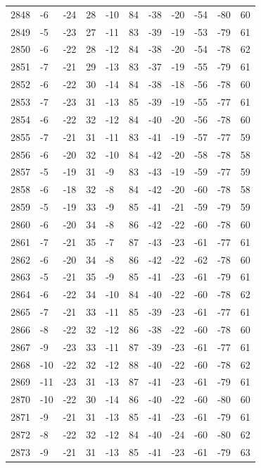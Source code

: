 \begin{table}[H]
\begin{tabular}{lllllllllll}
2848 & -6 & -24 & 28 & -10 & 84 & -38 & -20 & -54 & -80 & 60 \\
2849 & -5 & -23 & 27 & -11 & 83 & -39 & -19 & -53 & -79 & 61 \\
2850 & -6 & -22 & 28 & -12 & 84 & -38 & -20 & -54 & -78 & 62 \\
2851 & -7 & -21 & 29 & -13 & 83 & -37 & -19 & -55 & -79 & 61 \\
2852 & -6 & -22 & 30 & -14 & 84 & -38 & -18 & -56 & -78 & 60 \\
2853 & -7 & -23 & 31 & -13 & 85 & -39 & -19 & -55 & -77 & 61 \\
2854 & -6 & -22 & 32 & -12 & 84 & -40 & -20 & -56 & -78 & 60 \\
2855 & -7 & -21 & 31 & -11 & 83 & -41 & -19 & -57 & -77 & 59 \\
2856 & -6 & -20 & 32 & -10 & 84 & -42 & -20 & -58 & -78 & 58 \\
2857 & -5 & -19 & 31 & -9 & 83 & -43 & -19 & -59 & -77 & 59 \\
2858 & -6 & -18 & 32 & -8 & 84 & -42 & -20 & -60 & -78 & 58 \\
2859 & -5 & -19 & 33 & -9 & 85 & -41 & -21 & -59 & -79 & 59 \\
2860 & -6 & -20 & 34 & -8 & 86 & -42 & -22 & -60 & -78 & 60 \\
2861 & -7 & -21 & 35 & -7 & 87 & -43 & -23 & -61 & -77 & 61 \\
2862 & -6 & -20 & 34 & -8 & 86 & -42 & -22 & -62 & -78 & 60 \\
2863 & -5 & -21 & 35 & -9 & 85 & -41 & -23 & -61 & -79 & 61 \\
2864 & -6 & -22 & 34 & -10 & 84 & -40 & -22 & -60 & -78 & 62 \\
2865 & -7 & -21 & 33 & -11 & 85 & -39 & -23 & -61 & -77 & 61 \\
2866 & -8 & -22 & 32 & -12 & 86 & -38 & -22 & -60 & -78 & 60 \\
2867 & -9 & -23 & 33 & -11 & 87 & -39 & -23 & -61 & -77 & 61 \\
2868 & -10 & -22 & 32 & -12 & 88 & -40 & -22 & -60 & -78 & 62 \\
2869 & -11 & -23 & 31 & -13 & 87 & -41 & -23 & -61 & -79 & 61 \\
2870 & -10 & -22 & 30 & -14 & 86 & -40 & -22 & -60 & -80 & 60 \\
2871 & -9 & -21 & 31 & -13 & 85 & -41 & -23 & -61 & -79 & 61 \\
2872 & -8 & -22 & 32 & -12 & 84 & -40 & -24 & -60 & -80 & 62 \\
2873 & -9 & -21 & 31 & -13 & 85 & -41 & -23 & -61 & -79 & 63 \\

\end{tabular}
\end{table}
